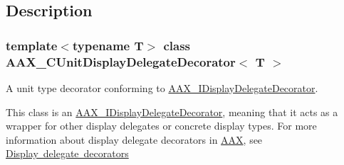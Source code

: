 \subsection{Description}
\subsubsection*{template$<$typename T$>$\newline
class A\+A\+X\+\_\+\+C\+Unit\+Display\+Delegate\+Decorator$<$ T $>$}

A unit type decorator conforming to \mbox{\hyperlink{a01805}{A\+A\+X\+\_\+\+I\+Display\+Delegate\+Decorator}}. 

This class is an \mbox{\hyperlink{a01805}{A\+A\+X\+\_\+\+I\+Display\+Delegate\+Decorator}}, meaning that it acts as a wrapper for other display delegates or concrete display types. For more information about display delegate decorators in \mbox{\hyperlink{a00852}{A\+AX}}, see \mbox{\hyperlink{a00816_displaydelegates_decorators}{Display delegate decorators}}

